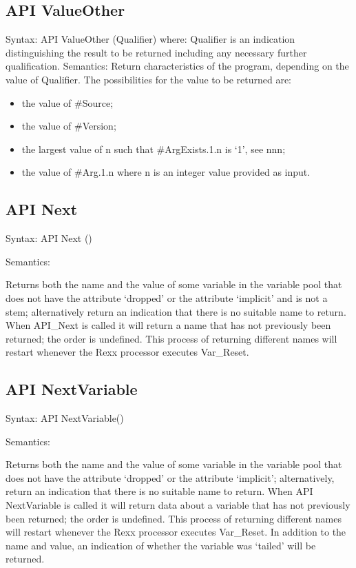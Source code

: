 \subsection{API ValueOther}\label{api-valueother}

Syntax: API ValueOther (Qualifier) where: Qualifier is an indication
distinguishing the result to be returned including any necessary further
qualification. Semantics: Return characteristics of the program,
depending on the value of Qualifier. The possibilities for the value to
be returned are:

\begin{itemize}
\item
  the value of \#Source;
\item
  the value of \#Version;
\item
  the largest value of n such that \#ArgExists.1.n is `1', see nnn;
\item
  the value of \#Arg.1.n where n is an integer value provided as input.
\end{itemize}

\subsection{API Next}\label{api-next}

Syntax: API Next ()

Semantics:

Returns both the name and the value of some variable in the variable
pool that does not have the attribute `dropped' or the attribute
`implicit' and is not a stem; alternatively return an indication that
there is no suitable name to return. When API\_Next is called it will
return a name that has not previously been returned; the order is
undefined. This process of returning different names will restart
whenever the Rexx processor executes Var\_Reset.

\subsection{API NextVariable}\label{api-nextvariable}

Syntax: API NextVariable()

Semantics:

Returns both the name and the value of some variable in the variable
pool that does not have the attribute `dropped' or the attribute
`implicit'; alternatively, return an indication that there is no
suitable name to return. When API NextVariable is called it will return
data about a variable that has not previously been returned; the order
is undefined. This process of returning different names will restart
whenever the Rexx processor executes Var\_Reset. In addition to the name
and value, an indication of whether the variable was `tailed' will be
returned.
